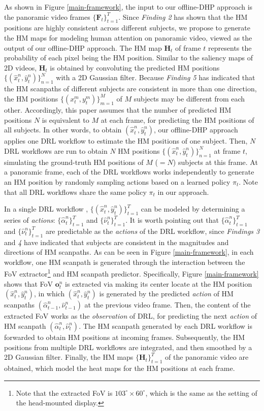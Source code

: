 \documentclass[10pt,journal,compsoc]{IEEEtran}
\begin{document}
As shown in Figure \ref{main-framework}, the input to our offline-DHP approach is the panoramic video frames $\{\mathbf{F}_t\}_{t=1}^{T}$.
Since \textit{Finding 2} has shown that the HM positions are highly consistent across different subjects,  we propose to generate the HM maps for modeling human attention on panoramic video, viewed as the output of our offline-DHP approach. The HM map $\mathbf{H}_t$ of frame $t$ represents the probability of each pixel being the HM position.
Similar to the saliency maps of 2D videos, $\mathbf{H}_t$ is obtained by convoluting the predicted HM positions $\{(\hat{x}^n_t, \hat{y}^n_t)\}_{n=1}^{N}$ with a 2D Gaussian filter.
Because \textit{Finding 5} has indicated that the HM scanpaths of different subjects are consistent in more than one direction, the HM positions $\{({x}^m_t, {y}^m_t)\}_{m=1}^{M}$ of $M$ subjects may be different from each other. Accordingly, this paper assumes that the number of predicted HM positions $N$ is equivalent to $M$ at each frame, for predicting the HM positions of all subjects.
In other words, to obtain $(\hat{x}^n_t, \hat{y}^n_t)$, our offline-DHP approach applies one DRL workflow to estimate the HM positions of one subject.
Then, $N$ DRL workflows are run to obtain $N$ HM positions $\{(\hat{x}^n_t, \hat{y}^n_t)\}_{n=1}^{N}$ at frame $t$, simulating the ground-truth HM positions of $M$ ($=N$) subjects at this frame.
At a panoramic frame, each of the DRL workflows works independently to generate an HM position by randomly sampling actions based on a learned policy $\pi_t$.
Note that all DRL workflows share the same policy $\pi_t$ in our approach.

In a single DRL workflow , $\{(\hat{x}^n_t, \hat{y}^n_t)\}_{t=1}^T$ can be modeled by determining a series of \textit{actions}: $\{\hat{\alpha}^n_t\}_{t=1}^T$ and $\{\hat{\nu}^n_t\}_{t=1}^T$.
It is worth pointing out that $\{\hat{\alpha}^n_t\}_{t=1}^{T}$ and $\{\hat{\nu}^n_t\}_{t=1}^{T}$ are predictable as the \textit{actions} of the DRL workflow, since \textit{Findings 3} and \textit{4} have indicated that subjects are consistent in the magnitudes and directions of HM scanpaths.
As can be seen in Figure \ref{main-framework}, in each workflow, one HM scanpath is generated through the interaction between the FoV extractor\footnote{Note that the extracted FoV is $103^{\circ} \times 60^{\circ}$, which is the same as the setting of the head-mounted display.} and HM scanpath predictor.
Specifically, Figure \ref{main-framework} shows that FoV $\mathbf{o}^n_t$ is extracted via making its center locate at the HM position $(\hat{x}^n_t,\hat{y}^n_t)$, in which $(\hat{x}^n_t,\hat{y}^n_t)$ is generated by the predicted \textit{action} of HM scanpaths $(\hat{\alpha}^n_{t-1},\hat{\nu}^n_{t-1})$ at the previous video frame.
Then, the content of the extracted FoV works as the \textit{observation} of DRL, for predicting the next \textit{action} of HM scanpath $(\hat{\alpha}^n_{t},\hat{\nu}^n_{t})$.
The HM scanpath generated by each DRL workflow is forwarded to obtain HM positions at incoming frames.
Subsequently, the HM positions from multiple DRL workflows are integrated, and then smoothed by a 2D Gaussian filter.
Finally, the HM maps $\{\mathbf{H}_t\}_{t=1}^{T}$ of the panoramic video are obtained, which model the heat maps for the HM positions at each frame.
\end{document}
